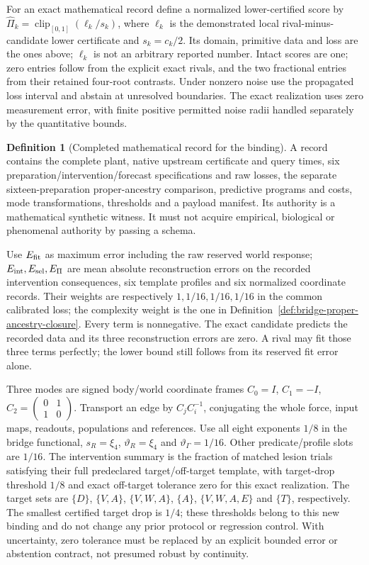 \documentclass[11pt,a4paper]{article}
\theoremstyle{definition}
\newtheorem{definition}[theorem]{Definition}
\begin{document}
For an exact mathematical record define a normalized lower-certified score
by $\widehat\Pi_k=\operatorname{clip}_{[0,1]}(\ell_k/s_k)$, where $\ell_k$
is the demonstrated local rival-minus-candidate lower certificate and
$s_k=c_k/2$. Its domain, primitive data and loss are the ones above; $\ell_k$
is not an arbitrary reported number. Intact scores are one; zero entries
follow from the explicit exact rivals, and the two fractional entries from
their retained four-root contrasts. Under nonzero noise
use the propagated loss interval and abstain at unresolved boundaries.
The exact realization uses zero measurement error, with finite positive
permitted noise radii handled separately by the quantitative bounds.

\begin{definition}[Completed mathematical record for the binding]
\label{def:bridge-completed-operational-binding}
A record contains the complete plant, native upstream certificate and query
times, six preparation/intervention/forecast specifications and raw losses,
the separate sixteen-preparation proper-ancestry comparison, predictive
programs and costs, mode transformations, thresholds and a payload manifest.
Its authority is a mathematical synthetic witness. It must not acquire
empirical, biological or phenomenal authority by passing a schema.

Use $E_{\rm fit}$ as maximum error including the raw reserved world response;
$E_{\rm int},E_{\rm sel},E_\Pi$ are mean absolute reconstruction errors on
the recorded intervention consequences, six template profiles and six
normalized coordinate records. Their weights are respectively
$1,1/16,1/16,1/16$ in the common calibrated loss; the complexity weight is
the one in Definition~\ref{def:bridge-proper-ancestry-closure}. Every term is
nonnegative. The exact candidate predicts the recorded data and its three
reconstruction errors are zero. A rival may fit those three terms perfectly;
the lower bound still follows from its reserved fit error alone.

Three modes are signed body/world coordinate frames $C_0=I$, $C_1=-I$,
$C_2=\left(\begin{smallmatrix}0&1\\1&0\end{smallmatrix}\right)$.
Transport an edge by $C_jC_i^{-1}$, conjugating the whole force, input maps,
readouts, populations and references. Use all eight exponents $1/8$ in the
bridge functional, $s_R=\xi_4$, $\vartheta_R=\xi_4$ and
$\vartheta_\Gamma=1/16$. Other predicate/profile slots are $1/16$.
The intervention summary is the fraction of matched lesion trials satisfying
their full predeclared target/off-target template, with target-drop threshold
$1/8$ and exact off-target tolerance zero for this exact realization.
The target sets are $\{D\}$, $\{V,A\}$, $\{V,W,A\}$,
$\{A\}$, $\{V,W,A,E\}$ and $\{T\}$, respectively. The smallest
certified target drop is $1/4$; these thresholds belong to this new binding
and do not change any prior protocol or regression control.
With uncertainty, zero tolerance must be replaced by an explicit bounded
error or abstention contract, not presumed robust by continuity.
\end{definition}
\end{document}
